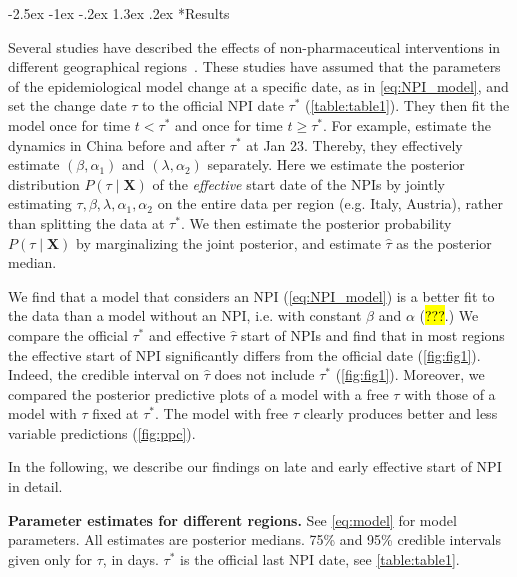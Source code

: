 \documentclass[12pt]{extarticle}
\makeatletter
\renewcommand\section{\@startsection {section}{1}{\z@}%
     {-2.5ex \@plus -1ex \@minus -.2ex}%
     {1.3ex \@plus.2ex}%
    {\Large\bfseries}}
\let\vec\mathbf
\makeatother
\begin{document}
\section*{Results}

Several studies have described the effects of non-pharmaceutical interventions in different geographical regions~\citep{Flaxman2020,Gatto2020,Li2020}. 
These studies have assumed that the parameters of the epidemiological model change at a specific date, as in \autoref{eq:NPI_model}, and set the change date $\tau$ to the official NPI date $\tau^*$ (\autoref{table:table1}).
They then fit the model once for time $t<\tau^*$ and once for time $t \ge \tau^*$.
For example, \citet{Li2020} estimate the dynamics in China before and after $\tau^*$ at Jan 23. Thereby, they effectively estimate $(\beta, \alpha_1)$ and $(\lambda, \alpha_2)$ separately.
Here we estimate the posterior distribution $P(\tau \mid \vec{X})$ of the \emph{effective} start date of the NPIs by jointly estimating $\tau, \beta, \lambda, \alpha_1, \alpha_2$ on the entire data per region (e.g. Italy, Austria), rather than splitting the data at $\tau^*$.
We then estimate the posterior probability $P(\tau \mid \vec{X})$ by marginalizing the joint posterior, and estimate $\hat{\tau}$ as the posterior median.

We find that a model that considers an NPI (\autoref{eq:NPI_model}) is a better fit to the data than a model without an NPI, i.e. with constant $\beta$ and $\alpha$ (\hl{???}.)
We compare the official $\tau^*$ and effective $\hat{\tau}$ start of NPIs and find that in most regions the effective start of NPI  significantly differs from the official date (\autoref{fig:fig1}). Indeed, the credible interval on $\hat{\tau}$ does not include $\tau^*$ (\autoref{fig:fig1}).
Moreover, we compared the posterior predictive plots of a model with a free $\tau$ with those of a model with $\tau$ fixed at $\tau^*$. The model with free $\tau$ clearly produces better and less variable predictions (\autoref{fig:ppc}).

In the following, we describe our findings on late and early effective start of NPI in detail.



\begin{landscape}
\begin{table}[h]
\centering

\caption{
\textbf{Parameter estimates for different regions.}
See \autoref{eq:model} for model parameters.
All estimates are posterior medians.
75\% and 95\% credible intervals given only for $\tau$, in days.
$\tau^*$ is the official last NPI date, see \autoref{table:table1}.
}
\label{table:table2}
\end{table}
\end{landscape}
\end{document}
